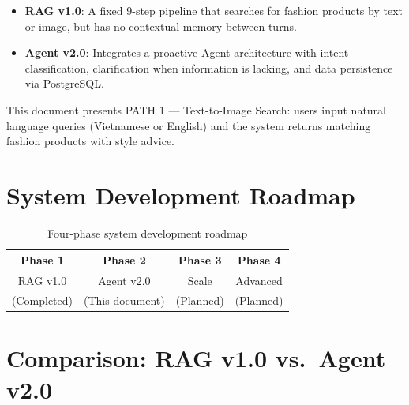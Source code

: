 \documentclass[12pt, twoside]{report}
\begin{document}
\begin{itemize}
    \item \textbf{RAG v1.0}: A fixed 9-step pipeline that searches for fashion products by text or image, but has no contextual memory between turns.
    \item \textbf{Agent v2.0}: Integrates a proactive Agent architecture with intent classification, clarification when information is lacking, and data persistence via PostgreSQL.
\end{itemize}

This document presents PATH 1 --- Text-to-Image Search: users input natural language queries (Vietnamese or English) and the system returns matching fashion products with style advice.

\section{System Development Roadmap}

\begin{table}[H]
\centering
\begin{tabular}{|c|c|c|c|}
\hline
\textbf{Phase 1} & \textbf{Phase 2} & \textbf{Phase 3} & \textbf{Phase 4}\\
\hline
RAG v1.0    & Agent v2.0          & Scale     & Advanced\\
(Completed) & (This document)     & (Planned) & (Planned)\\
\hline
\end{tabular}
\caption{Four-phase system development roadmap}
\end{table}

\section{Comparison: RAG v1.0 vs.\ Agent v2.0}
\end{document}
